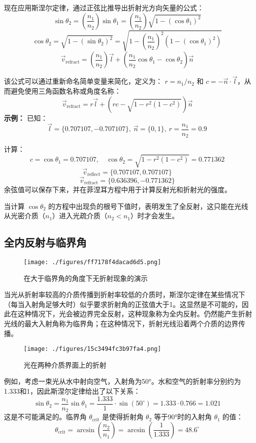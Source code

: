 现在应用斯涅尔定律，通过正弦比推导出折射光方向矢量的公式：  
\[
\sin \theta_2 = \left( \frac{n_1}{n_2} \right) \sin \theta_1 = \left( \frac{n_1}{n_2} \right) \sqrt{1 - \left( \cos \theta_1 \right)^2}~
\]
\[
\cos \theta_2 = \sqrt{1 - (\sin \theta_2)^2} = \sqrt{1 - \left( \frac{n_1}{n_2} \right)^2 \left( 1 - \left( \cos \theta_1 \right)^2 \right)}~
\]
\[
\vec{v}_{\text{refract}} = \left( \frac{n_1}{n_2} \right) \vec{l} + \left( \frac{n_1}{n_2} \cos \theta_1 - \cos \theta_2 \right) \vec{n}~
\]

该公式可以通过重新命名简单变量来简化，定义为：  
\( r = n_1 / n_2 \) 和 \( c = -\vec{n} \cdot \vec{l} \)，从而避免使用三角函数名称或角度名称：  
\[
\vec{v}_{\text{refract}} = r\vec{l} + \left( rc - \sqrt{1 - r^2 (1 - c^2)} \right)\vec{n}~
\]
\textbf{示例：} 
已知：  
\[
\vec{l} = \{0.707107, -0.707107\},~\vec{n} = \{0, 1\},~r = \frac{n_1}{n_2} = 0.9~
\]

计算：  
\[
c = \cos \theta_1 = 0.707107, \quad \cos \theta_2 = \sqrt{1 - r^2 (1 - c^2)} = 0.771362~
\]
\[
\vec{v}_{\text{reflect}} = \{0.707107, 0.707107\}~
\]
\[
\vec{v}_{\text{refract}} = \{0.636396, -0.771362\}~
\]
余弦值可以保存下来，并在菲涅耳方程中用于计算反射光和折射光的强度。

当计算 \(\cos \theta_2\) 的方程中出现负的根号下值时，表明发生了全反射，这只能在光线从光密介质（\(n_1\)）进入光疏介质（\(n_2 < n_1\)）时才会发生。

\subsection{全内反射与临界角}
\begin{figure}[ht]
\centering
\texttt{[image: ./figures/ff7178f4dacad6d5.png]}
\caption{在大于临界角的角度下无折射现象的演示} \label{fig_SNR_8}
\end{figure}
当光从折射率较高的介质传播到折射率较低的介质时，斯涅尔定律在某些情况下（每当入射角足够大时）似乎要求折射角的正弦值大于1。这显然是不可能的，因此在这种情况下，光会被边界完全反射，这种现象称为全内反射。仍然能产生折射光线的最大入射角称为临界角；在这种情况下，折射光线沿着两个介质的边界传播。
\begin{figure}[ht]
\centering
\texttt{[image: ./figures/15c3494fc3b97fa4.png]}
\caption{光在两种介质界面上的折射} \label{fig_SNR_9}
\end{figure}
例如，考虑一束光从水中射向空气，入射角为50°。水和空气的折射率分别约为1.333和1，因此斯涅尔定律给出了以下关系：
\[
\sin \theta_2 = \frac{n_1}{n_2} \sin \theta_1 = \frac{1.333}{1} \cdot \sin(50^\circ) = 1.333 \cdot 0.766 = 1.021~
\]
这是不可能满足的。临界角 \(\theta_{\text{crit}}\) 是使得折射角 \(\theta_2\) 等于90°时的入射角 \(\theta_1\) 的值：
\[
\theta_{\text{crit}} = \arcsin \left( \frac{n_2}{n_1} \right) = \arcsin \left( \frac{1}{1.333} \right) = 48.6^\circ~
\]
